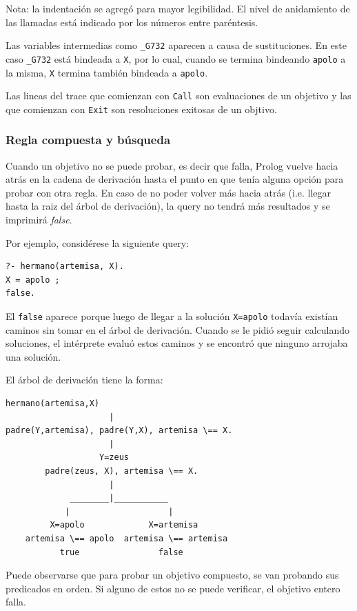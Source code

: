 \documentclass[12pt,titlepage]{article}
\begin{document}
Nota: la indentación se agregó para mayor legibilidad. El nivel de anidamiento de las llamadas está indicado por los números entre paréntesis.

Las variables intermedias como \lstinline|_G732| aparecen a causa de sustituciones. En este caso \lstinline|_G732| está bindeada a \lstinline|X|, por lo cual, cuando se termina bindeando \lstinline|apolo| a la misma, \lstinline|X| termina también bindeada a \lstinline|apolo|.

Las lineas del trace que comienzan con \lstinline|Call| son evaluaciones de un objetivo y las que comienzan con \lstinline|Exit| son resoluciones exitosas de un objtivo.

\subsubsection{Regla compuesta y búsqueda}

Cuando un objetivo no se puede probar, es decir que falla, Prolog vuelve hacia atrás en la cadena de derivación hasta el punto en que tenía alguna opción para probar con otra regla. En caso de no poder volver más hacia atrás (i.e. llegar hasta la raiz del árbol de derivación), la query no tendrá más resultados y se imprimirá \emph{false}.

Por ejemplo, considérese la siguiente query:
\begin{lstlisting}
?- hermano(artemisa, X).
X = apolo ;
false.
\end{lstlisting}

El \lstinline|false| aparece porque luego de llegar a la solución \lstinline|X=apolo| todavía existían caminos sin tomar en el árbol de derivación. Cuando se le pidió seguir calculando soluciones, el intérprete evaluó estos caminos y se encontró que ninguno arrojaba una solución.

El árbol de derivación tiene la forma:
\begin{Verbatim}[samepage=true,fontsize=\small]
            hermano(artemisa,X)
                     |
padre(Y,artemisa), padre(Y,X), artemisa \== X.
                     |
                   Y=zeus
        padre(zeus, X), artemisa \== X.
                     |             
             ________|___________
            |                    |
         X=apolo             X=artemisa
    artemisa \== apolo  artemisa \== artemisa
           true                false
\end{Verbatim}

Puede observarse que para probar un objetivo compuesto, se van probando sus predicados en orden. Si alguno de estos no se puede verificar, el objetivo entero falla.
\end{document}
